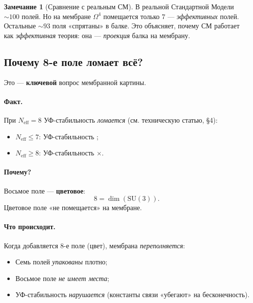 \documentclass[11pt,a4paper]{article}
\newcommand{\SU}{\mathrm{SU}}
\newcommand{\Om}{\Omega^4}
\newcommand{\Neff}{N_{\text{eff}}}
\theoremstyle{definition}
\newtheorem{remark}[theorem]{Замечание}
\begin{document}
\begin{remark}[Сравнение с реальным СМ]
\label{rem:vs-sm}
В реальной Стандартной Модели $\sim 100$ полей. Но на мембране 
$\Om$ помещается только \textbf{$7$} — \emph{эффективных} полей. 
Остальные $\sim 93$ поля «спрятаны» в балке. Это объясняет, 
почему СМ работает как \emph{эффективная} теория: она — 
\emph{проекция} балка на мембрану.
\end{remark}

\subsection{Почему 8-е поле ломает всё?}
\label{subsec:eighth-field}

Это — \textbf{ключевой} вопрос мембранной картины.

\paragraph{Факт.}
При $\Neff = 8$ УФ-стабильность \emph{ломается} 
(см. техническую статью, §4):
\begin{itemize}
    \item $\Neff \le 7$: УФ-стабильность \checkmark;
    \item $\Neff \ge 8$: УФ-стабильность $\times$.
\end{itemize}

\paragraph{Почему?}
Восьмое поле — \textbf{цветовое}:
\begin{equation}
    8 = \dim(\SU(3)).
\end{equation}
Цветовое поле «не помещается» на мембране.

\paragraph{Что происходит.}
Когда добавляется 8-е поле (цвет), мембрана \emph{переполняется}:
\begin{itemize}
    \item Семь полей \emph{упакованы} плотно;
    \item Восьмое поле \emph{не имеет места};
    \item УФ-стабильность \emph{нарушается} (константы связи 
          «убегают» на бесконечность).
\end{itemize}
\end{document}
